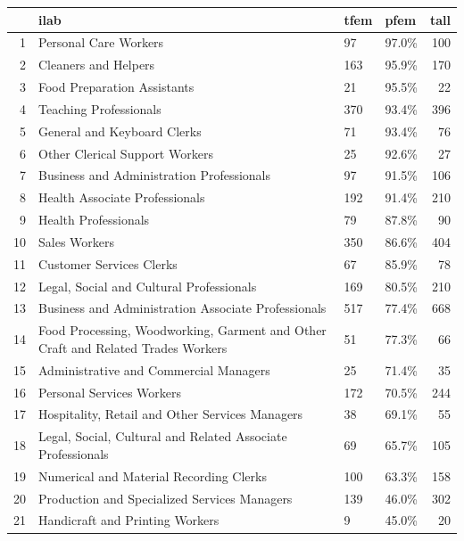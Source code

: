 \documentclass[12pt,a4paper]{article}
\begin{document}
\begin{table}[ht]
\begin{small}
\centering
\begin{tabular}{rp{8cm}llr}
  \hline
 & ilab & tfem & pfem & tall \\ 
  \hline
1 & Personal Care Workers & 97 & 97.0\% & 100 \\ 
  2 & Cleaners and Helpers & 163 & 95.9\% & 170 \\ 
  3 & Food Preparation Assistants & 21 & 95.5\% &  22 \\ 
  4 & Teaching Professionals & 370 & 93.4\% & 396 \\ 
  5 & General and Keyboard Clerks & 71 & 93.4\% &  76 \\ 
  6 & Other Clerical Support Workers & 25 & 92.6\% &  27 \\ 
  7 & Business and Administration Professionals & 97 & 91.5\% & 106 \\ 
  8 & Health Associate Professionals & 192 & 91.4\% & 210 \\ 
  9 & Health Professionals & 79 & 87.8\% &  90 \\ 
  10 & Sales Workers & 350 & 86.6\% & 404 \\ 
  11 & Customer Services Clerks & 67 & 85.9\% &  78 \\ 
  12 & Legal, Social and Cultural Professionals & 169 & 80.5\% & 210 \\ 
  13 & Business and Administration Associate Professionals & 517 & 77.4\% & 668 \\ 
  14 & Food Processing, Woodworking, Garment and Other Craft and Related Trades Workers & 51 & 77.3\% &  66 \\ 
  15 & Administrative and Commercial Managers & 25 & 71.4\% &  35 \\ 
  16 & Personal Services Workers & 172 & 70.5\% & 244 \\ 
  17 & Hospitality, Retail and Other Services Managers & 38 & 69.1\% &  55 \\ 
  18 & Legal, Social, Cultural and Related Associate Professionals & 69 & 65.7\% & 105 \\ \hline
  19 & Numerical and Material Recording Clerks & 100 & 63.3\% & 158 \\ 
  20 & Production and Specialized Services Managers & 139 & 46.0\% & 302 \\ 
  21 & Handicraft and Printing Workers & 9 & 45.0\% &  20 \\ \hline

\end{tabular}
\end{small}
\end{table}
\end{document}

